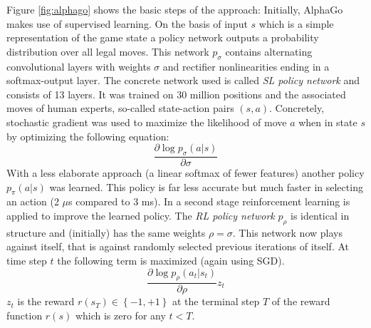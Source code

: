 Figure \ref{fig:alphago} shows the basic steps of the approach: Initially, AlphaGo makes use of supervised learning. On the basis of input $s$ which is a simple representation of the game state a policy network outputs a probability distribution over all legal moves. This network $p_\sigma$ contains alternating convolutional layers with weights $\sigma$ and rectifier nonlinearities ending in a softmax-output layer. The concrete network used is called \textit{SL policy network} and consists of 13 layers. It was trained on 30 million positions and the associated moves of human experts, so-called state-action pairs $(s,a)$. Concretely, stochastic gradient was used to maximize the likelihood of move $a$ when in state $s$ by optimizing the following equation:
\begin{equation*}
    \frac{\partial \log p_\sigma (a | s)}{\partial \sigma}
\end{equation*}
With a less elaborate approach (a linear softmax of fewer features) another policy $p_\pi(a|s)$ was learned. This policy is far less accurate but much faster in selecting an action (2 $\mu$s compared to $3$ ms). In a second stage reinforcement learning is applied to improve the learned policy. The \textit{RL policy network} $p_\rho$ is identical in structure and (initially) has the same weights $\rho = \sigma$. This network now plays against itself, that is against randomly selected previous iterations of itself. At time step $t$ the following term is maximized (again using SGD).
\begin{equation*}
    \frac{\partial \log p_\rho(a_t | s_t)}{\partial \rho} z_t
\end{equation*}
 $z_t$ is the reward $r(s_T) \in \left\{-1,+1\right\}$ at the terminal step $T$ of the reward function $r(s)$ which is zero for any $t < T$.


